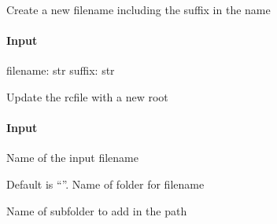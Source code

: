 \documentclass[letterpaper,10pt,english]{sphinxmanual}
\begin{document}

\begin{fulllineitems}
\label{\detokenize{api/pymusepipe:pymusepipe.target_sample.insert_suffix}}
\pysigstartsignatures
{}
\pysigstopsignatures
\sphinxAtStartPar
Create a new filename including the
suffix in the name


\paragraph{Input}
\label{\detokenize{api/pymusepipe:id119}}
\sphinxAtStartPar
filename: str
suffix: str

\end{fulllineitems}


\begin{fulllineitems}
\label{\detokenize{api/pymusepipe:pymusepipe.target_sample.update_calib_file}}
\pysigstartsignatures
{}
\pysigstopsignatures
\sphinxAtStartPar
Update the rcfile with a new root


\paragraph{Input}
\label{\detokenize{api/pymusepipe:id120}}\begin{description}
\sphinxAtStartPar
Name of the input filename

\sphinxAtStartPar
Default is “”. Name of folder for filename

\sphinxAtStartPar
Name of subfolder to add in the path

\end{description}

\end{fulllineitems}
\end{document}
